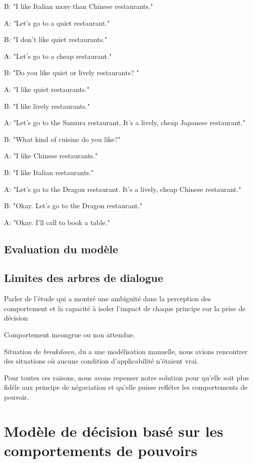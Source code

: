 	B: "I like Italian more than Chinese restaurants."
	
	A: "Let's go to a quiet restaurant."
	
	B: "I don't like quiet restaurants."
	
	A: "Let's go to a cheap restaurant."
	
	B: "Do you like quiet or lively restaurants? "
	
	A: "I like quiet restaurants."
	
	B: "I like lively restaurants."
	
	A: "Let's go to the Samura restaurant. It's a lively, cheap Japanese restaurant."
	
	B: "What kind of cuisine do you like?"
	
	A: "I like Chinese restaurants."
	
	B: "I like Italian restaurants."
	
	A: "Let's go to the Dragon restaurant. It's a lively, cheap Chinese restaurant."
	
	B: "Okay. Let's go to the Dragon restaurant."
	
	A: "Okay. I'll call to book a table."
	
	
	\subsection{Evaluation du modèle}
	\subsection{Limites des arbres de dialogue}
	Parler de l'étude qui a montré une ambiguïté dans la perception des comportement et la capacité à isoler l'impact de chaque principe sur la prise de décision
	
	Comportement incongrue ou non attendue.
	
	Situation de \textit{breakdown}, du a une modélisation manuelle, nous avions rencontrer des situations où aucune condition d'applicabilité n'étaient vrai. 
	
	Pour toutes ces raisons, nous avons repenser notre solution pour qu'elle soit plus fidèle aux principe de négociation et qu'elle puisse refléter les comportements de pouvoir. 
	
	\section{Modèle de décision basé sur les comportements de pouvoirs}
	
